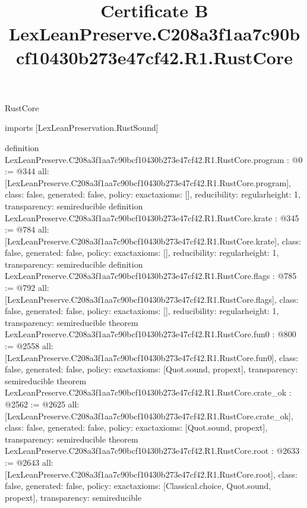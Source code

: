 \begin{lexlean}{RustCore}
\title{Certificate B LexLeanPreserve.C208a3f1aa7c90bcf10430b273e47cf42.R1.RustCore}
\begin{coremodule}
imports [LexLeanPreservation.RustSound]

definition LexLeanPreserve.C208a3f1aa7c90bcf10430b273e47cf42.R1.RustCore.program : @0 := @344 {
  all: [LexLeanPreserve.C208a3f1aa7c90bcf10430b273e47cf42.R1.RustCore.program],
  class: false,
  generated: false,
  policy: exact{axioms: []},
  reducibility: regular{height: 1},
  transparency: semireducible
}
definition LexLeanPreserve.C208a3f1aa7c90bcf10430b273e47cf42.R1.RustCore.krate : @345 := @784 {
  all: [LexLeanPreserve.C208a3f1aa7c90bcf10430b273e47cf42.R1.RustCore.krate],
  class: false,
  generated: false,
  policy: exact{axioms: []},
  reducibility: regular{height: 1},
  transparency: semireducible
}
definition LexLeanPreserve.C208a3f1aa7c90bcf10430b273e47cf42.R1.RustCore.flags : @785 := @792 {
  all: [LexLeanPreserve.C208a3f1aa7c90bcf10430b273e47cf42.R1.RustCore.flags],
  class: false,
  generated: false,
  policy: exact{axioms: []},
  reducibility: regular{height: 1},
  transparency: semireducible
}
theorem LexLeanPreserve.C208a3f1aa7c90bcf10430b273e47cf42.R1.RustCore.fun0 : @800 := @2558 {
  all: [LexLeanPreserve.C208a3f1aa7c90bcf10430b273e47cf42.R1.RustCore.fun0],
  class: false,
  generated: false,
  policy: exact{axioms: [Quot.sound, propext]},
  transparency: semireducible
}
theorem LexLeanPreserve.C208a3f1aa7c90bcf10430b273e47cf42.R1.RustCore.crate_ok : @2562 := @2625 {
  all: [LexLeanPreserve.C208a3f1aa7c90bcf10430b273e47cf42.R1.RustCore.crate_ok],
  class: false,
  generated: false,
  policy: exact{axioms: [Quot.sound, propext]},
  transparency: semireducible
}
theorem LexLeanPreserve.C208a3f1aa7c90bcf10430b273e47cf42.R1.RustCore.root : @2633 := @2643 {
  all: [LexLeanPreserve.C208a3f1aa7c90bcf10430b273e47cf42.R1.RustCore.root],
  class: false,
  generated: false,
  policy: exact{axioms: [Classical.choice, Quot.sound, propext]},
  transparency: semireducible
}


\end{coremodule}
\end{lexlean}
